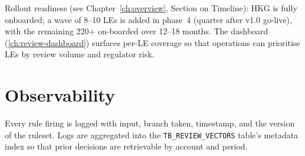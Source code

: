 \noindent
Rollout readiness (see Chapter~\ref{ch:overview}, Section on
Timeline): HKG is fully onboarded; a wave of 8--10 LEs is added in
phase~4 (quarter after v1.0 go-live), with the remaining 220+
on-boarded over 12--18 months. The dashboard
(\cref{ch:review-dashboard}) surfaces per-LE coverage so that
operations can prioritise LEs by review volume and regulator risk.

\section{Observability}

Every rule firing is logged with input, branch taken, timestamp, and
the version of the ruleset. Logs are aggregated into the
\texttt{TB\_REVIEW\_VECTORS} table's metadata index so that prior
decisions are retrievable by account and period.
